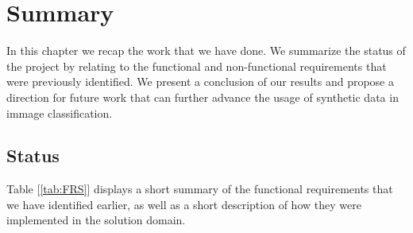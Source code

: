 \chapter{Summary}

In this chapter we recap the work that we have done. We summarize the status of the project by relating to the functional and non-functional requirements that were previously identified. We present a conclusion of our results and propose a direction for future work that can further advance the usage of synthetic data in immage classification.

\section{Status}

Table [\ref{tab:FRS}] displays a short summary of the functional requirements that we have identified earlier, as well as a short description of how they were implemented in the solution domain.

